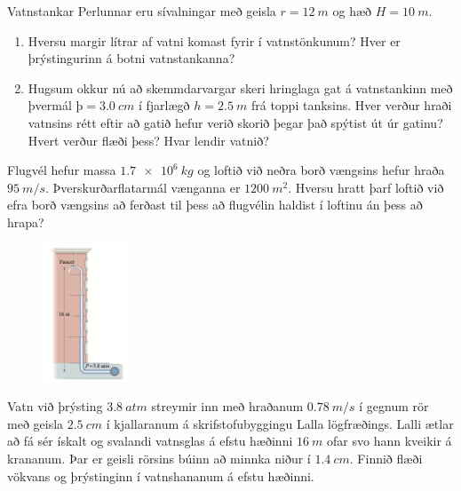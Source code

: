 \ifdefined \wholebook \else\documentclass[oneside]{book}\usepackage{EdlBook}\graphicspath{{figures/}}
\begin{document}
\begin{enumerate}[label = \textbf{Dæmi \thechapter.\arabic*.}]
\begin{minipage}{\linewidth}
\item Vatnstankar Perlunnar eru sívalningar með geisla $r = \SI{12}{m}$ og hæð $H = \SI{10}{m}$. 
\begin{enumerate}[label = \textbf{(\alph*)}]
    \item Hversu margir lítrar af vatni komast fyrir í vatnstönkunum? Hver er þrýstingurinn á botni vatnstankanna?
    \item Hugsum okkur nú að skemmdarvargar skeri hringlaga gat á vatnstankinn með þvermál $\text{þ} = \SI{3.0}{cm}$ í fjarlægð $h = \SI{2.5}{m}$ frá toppi tanksins. Hver verður hraði vatnsins rétt eftir að gatið hefur verið skorið þegar það spýtist út úr gatinu? Hvert verður flæði þess?  Hvar lendir vatnið?
\end{enumerate}
\end{minipage}

\item Flugvél hefur massa $\SI{1.7e6}{kg}$ og loftið við neðra borð vængsins hefur hraða $\SI{95}{m/s}$. Þverskurðarflatarmál vænganna er $\SI{1200}{m^2}$. Hversu hratt þarf loftið við efra borð vængsins að ferðast til þess að flugvélin haldist í loftinu án þess að hrapa?

\begin{minipage}{\linewidth}
\begin{figure}
\vspace{-0.5cm}
\hspace{0.5cm}
\includegraphics[width = 1in]{images/building.png}
\end{figure}

\item Vatn við þrýsting $\SI{3.8}{atm}$ streymir inn með hraðanum $\SI{0.78}{m/s}$ í gegnum rör með geisla $\SI{2.5}{cm}$ í kjallaranum á skrifstofubyggingu Lalla lögfræðings. Lalli ætlar að fá sér ískalt og svalandi vatnsglas á efstu hæðinni $\SI{16}{m}$ ofar svo hann kveikir á krananum. Þar er geisli rörsins búinn að minnka niður í $\SI{1.4}{cm}$. Finnið flæði vökvans og þrýstinginn í vatnshananum á efstu hæðinni.

\end{minipage}


\end{enumerate}
\end{document}
